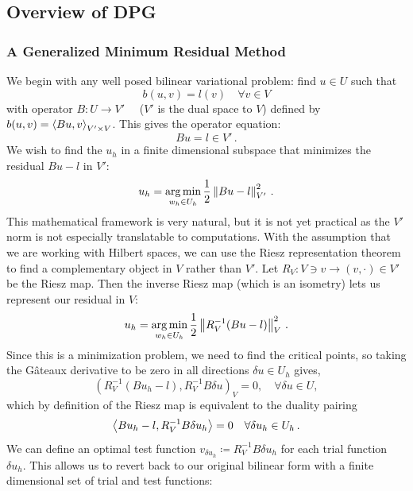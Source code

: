 \documentclass{article}
\begin{document}
\subsection{Overview of DPG}
\subsubsection{A Generalized Minimum Residual Method}
We begin with any well posed bilinear variational problem: find $u\in U$ such that
\[
b(u,v)=l(v) \quad\forall v\in V
\]
with operator $B:U\rightarrow V'\quad$ ($V'$ is the dual space to $V$) defined by $b(u,v)=\left\langle Bu,v \right\rangle_{V'\times V}$.
This gives the operator equation:
\[
Bu=l\in V'\,.
\]
We wish to find the $u_h$ in a finite dimensional subspace that minimizes the residual $Bu-l$ in $V'$:
\[
u_h=\operatorname*{arg\,min}_{w_h\in U_h}\frac{1}{2}\left\| Bu-l \right\|^2_{V'}\,.
\]
This mathematical framework is very natural, but it is not yet practical as the $V'$ norm is not especially translatable to computations.
With the assumption that we are working with Hilbert spaces, 
we can use the Riesz representation theorem to find a complementary object in $V$ rather than $V'$. 
Let $R_V:V\ni v\rightarrow(v,\cdot)\in V'$ be the Riesz map. 
Then the inverse Riesz map (which is an isometry) lets us represent our residual in $V$:
\[
u_h=\operatorname*{arg\,min}_{w_h\in U_h}\frac{1}{2}\left\| R_V^{-1}(Bu-l) \right\|^2_{V}\,.
\]
Since this is a minimization problem, we need to find the critical points, so
taking the G\^ateaux derivative to be zero in all directions $\delta u \in
U_h$ gives,
\[
\left(R_V^{-1}(Bu_h-l),R_V^{-1}B\delta u\right)_V = 0, \quad \forall \delta u \in U,
\]
which by definition of the Riesz map is equivalent to the duality pairing
\begin{equation*}
\left\langle Bu_h-l,R_V^{-1}B\delta u_h \right\rangle=0\quad\forall\delta u_h\in U_h\,.
\end{equation*}
We can define an optimal test function $v_{\delta u_h}\coloneqq R_V^{-1}B\delta u_h$ for each trial function $\delta u_h$.
This allows us to revert back to our original bilinear form with a finite dimensional set of trial and test functions:
\end{document}

